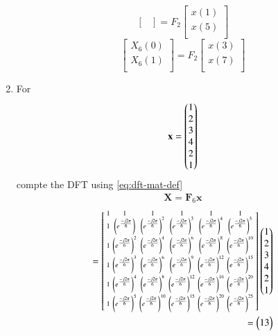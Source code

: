 \documentclass[journal,12pt,twocolumn]{IEEEtran}
\let\vec\mathbf
\renewcommand\thesection{\arabic{section}}
\begin{document}
\begin{enumerate}[label=\arabic*.,ref=\thesection.\theenumi]
\begin{equation}
\begin{bmatrix}
	\end{bmatrix}
	= F_{2}
	\begin{bmatrix}
		x(1) \\ 
		x(5) \\ 
	\end{bmatrix}
\end{equation}
\begin{equation}
	\begin{bmatrix}
		X_{6}(0) \\ 
		X_{6}(1)\\ 
	\end{bmatrix}
	= F_{2}
	\begin{bmatrix}
		x(3) \\ 
		x(7) \\ 
	\end{bmatrix}
\end{equation}
\item For 
\begin{align}
	\vec{x} = \myvec{1\\2\\3\\4\\2\\1}
	\label{eq:equation1}
\end{align}
compte the DFT  
using 
\eqref{eq:dft-mat-def}\\
\solution
\begin{align}
	\vec{X} = \vec{F}_6 \vec{x}
\end{align}	
\begin{align}
	= \begin{bsmallmatrix}
		1	&	1	&	1	&	1	&	1	&	1\\
		1	&	\left(e^{\frac{-j2\pi}{6}}\right)	&	\left(e^{\frac{-j2\pi}{6}}\right)^2	&	\left(e^{\frac{-j2\pi}{6}}\right)^3	&	\left(e^{\frac{-j2\pi}{6}}\right)^4	&	\left(e^{\frac{-j2\pi}{6}}\right)^5\\
		1	&	\left(e^{\frac{-j2\pi}{6}}\right)^2	&	\left(e^{\frac{-j2\pi}{6}}\right)^4	&	\left(e^{\frac{-j2\pi}{6}}\right)^6	&	\left(e^{\frac{-j2\pi}{6}}\right)^8	&	\left(e^{\frac{-j2\pi}{6}}\right)^{10}\\
		1	&	\left(e^{\frac{-j2\pi}{6}}\right)^3	&	\left(e^{\frac{-j2\pi}{6}}\right)^6	&	\left(e^{\frac{-j2\pi}{6}}\right)^9	&	\left(e^{\frac{-j2\pi}{6}}\right)^{12}	&	\left(e^{\frac{-j2\pi}{6}}\right)^{15}\\
		1	&	\left(e^{\frac{-j2\pi}{6}}\right)^4	&	\left(e^{\frac{-j2\pi}{6}}\right)^8	&	\left(e^{\frac{-j2\pi}{6}}\right)^{12}	&	\left(e^{\frac{-j2\pi}{6}}\right)^{16}	&	\left(e^{\frac{-j2\pi}{6}}\right)^{20}\\
		1	&	\left(e^{\frac{-j2\pi}{6}}\right)^5	&	\left(e^{\frac{-j2\pi}{6}}\right)^{10}	&	\left(e^{\frac{-j2\pi}{6}}\right)^{15}	&	\left(e^{\frac{-j2\pi}{6}}\right)^{20}	&	\left(e^{\frac{-j2\pi}{6}}\right)^{25}
	\end{bsmallmatrix}
	\begin{pmatrix}1\\2\\3\\4\\2\\1\end{pmatrix}\\
	=\begin{pmatrix}13\\\end{pmatrix}
\end{align}




\end{enumerate}
\end{document}
